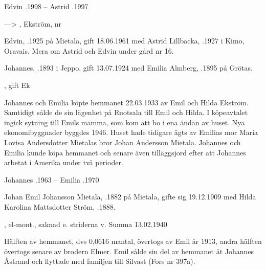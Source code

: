 Edvin .1998  --  Astrid .1997


--->	, Ekström,  nr 

Edvin, .1925 på Mietala, gift  18.06.1961 med Astrid Lillbacka, .1927 i Kimo, Oravais. Mera om Astrid och Edvin under gård nr 16.\jhvspace{}


Johannes, .1893 i Jeppo,  gift 13.07.1924 med Emilia Almberg, .1895 på Grötas.
\begin{jhchildren}
  \item {}
  \item {}, gift Ek
\end{jhchildren}


Johannes och Emilia köpte hemmanet 22.03.1933 av Emil och Hilda Ekström. Samtidigt sålde de sin lägenhet på  Ruotsala till Emil och Hilda. I köpeavtalet ingick sytning till Emils mamma, som kom att bo i ena ändan av huset. Nya ekonomibyggnader byggdes 1946. Huset hade tidigare ägts av Emilias mor Maria Lovisa Andersdotter Mietalas bror Johan Andersson Mietala. Johannes och Emilia kunde köpa hemmanet och senare även tilläggsjord efter att Johannes arbetat i Amerika under två perioder.

Johannes .1963  --  Emilia .1970


Johan Emil Johansson Mietala, .1882 på Mietala, gifte sig 19.12.1909  med Hilda Karolina Mattsdotter Ström, .1888.
\begin{jhchildren}
  \item {}
  \item {}, el-mont., saknad e. striderna v. Summa 13.02.1940
  \item {}
  \item {}
  \item {}
  \item {}
  \item {}
  \item {}
  \item {}
  \item {}
\end{jhchildren}
Hälften av hemmanet, dvs 0,0616 mantal, övertogs av Emil år 1913, andra hälften övertogs senare av brodern Elmer. Emil sålde sin del av hemmanet åt Johannes Åstrand och flyttade med familjen till Silvast (Fors nr 397a).


